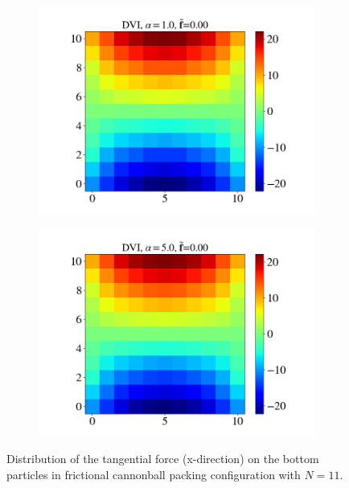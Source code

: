 \begin{itemize}
\begin{figure}[H]
\begin{subfigure}{0.32\columnwidth}
			\includegraphics[width=1.0\textwidth]{images/CD/Example7/10/T1_11_DVI_1.0.png}
		\end{subfigure}
		\begin{subfigure}{0.32\columnwidth}	
			\centering
			\includegraphics[width=1.0\textwidth]{images/CD/Example7/10/T1_11_DVI_5.0.png}
		\end{subfigure}
		\caption{Distribution of the tangential force (x-direction) on the bottom particles in frictional cannonball packing configuration with $N=11$.}\label{fig:cbp_fp_T1=11}
	\end{figure}
	

\end{itemize}
